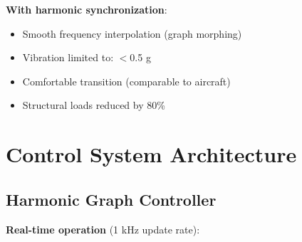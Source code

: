 \documentclass[12pt,a4paper]{article}
\begin{document}
\textbf{With harmonic synchronization}:
\begin{itemize}
\item Smooth frequency interpolation (graph morphing)
\item Vibration limited to: $<$0.5 g
\item Comfortable transition (comparable to aircraft)
\item Structural loads reduced by 80\%
\end{itemize}

\section{Control System Architecture}

\subsection{Harmonic Graph Controller}

\textbf{Real-time operation} (1 kHz update rate):
\end{document}
